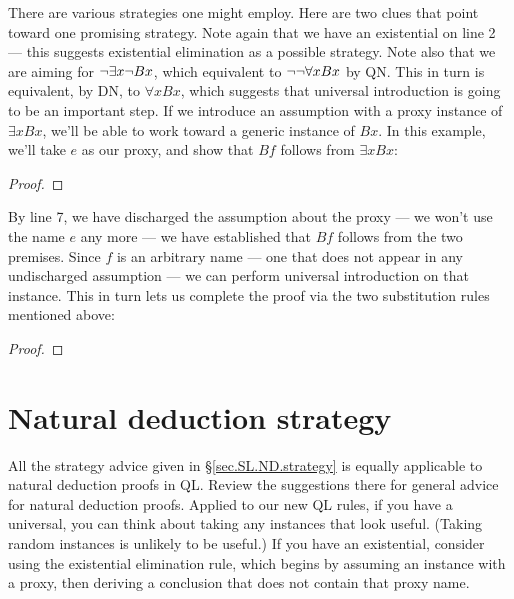 There are various strategies one might employ. Here are two clues that point toward one promising strategy. Note again that we have an existential on line 2 --- this suggests existential elimination as a possible strategy. Note also that we are aiming for $\neg \exists x \neg Bx$, which equivalent to $\neg \neg \forall x Bx$ by QN. This in turn is equivalent, by DN, to $\forall x Bx$, which suggests that universal introduction is going to be an important step. If we introduce an assumption with a proxy instance of $\exists x Bx$, we'll be able to work toward a generic instance of $Bx$. In this example, we'll take $e$ as our proxy, and show that $Bf$ follows from $\exists x Bx$:

\begin{proof}
	 
	\open
	\close
\end{proof}

By line 7, we have discharged the assumption about the proxy --- we won't use the name $e$ any more --- we have established that $Bf$ follows from the two premises. Since $f$ is an arbitrary name --- one that does not appear in any undischarged assumption --- we can perform universal introduction on that instance. This in turn lets us complete the proof via the two substitution rules mentioned above:

\begin{proof}
	 
	\open
	\close
\end{proof}



\section{Natural deduction strategy}

All the strategy advice given in \S\ref{sec.SL.ND.strategy} is equally applicable to natural deduction proofs in QL. Review the suggestions there for general advice for natural deduction proofs. Applied to our new QL rules, if you have a universal, you can think about taking any instances that look useful. (Taking random instances is unlikely to be useful.) If you have an existential, consider using the existential elimination rule, which begins by assuming an instance with a proxy, then deriving a conclusion that does not contain that proxy name.

